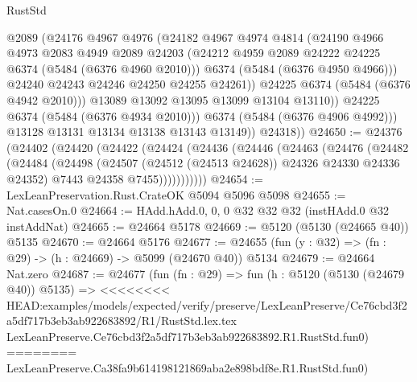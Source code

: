 \begin{lexlean}{RustStd}
\begin{coremodule}
{\begin{coremodule}
{{{{{{{{{{{{{{{{{{{{{{{{{{{{{{{                      @2089
                      (@24176
                        @4967
                        @4976
                        (@24182
                          @4967
                          @4974
                          @4814
                          (@24190
                            @4966
                            @4973
                            @2083
                            @4949
                            @2089
                            @24203
                            (@24212 @4959 @2089 @24222 @24225 @6374 (@5484 (@6376 @4960 @2010)))
                            @6374
                            (@5484 (@6376 @4950 @4966)))
                          @24240
                          @24243
                          @24246
                          @24250
                          @24255
                          @24261))
                      @24225
                      @6374
                      (@5484 (@6376 @4942 @2010)))
                    @13089
                    @13092
                    @13095
                    @13099
                    @13104
                    @13110))
                @24225
                @6374
                (@5484 (@6376 @4934 @2010)))
              @6374
              (@5484 (@6376 @4906 @4992)))
            @13128
            @13131
            @13134
            @13138
            @13143
            @13149))
        @24318))
@24650 := @24376
    (@24402
      (@24420
        (@24422
          (@24424
            (@24436
              (@24446
                (@24463
                  (@24476
                    (@24482
                      (@24484
                        (@24498
                          (@24507 (@24512 (@24513 @24628)) @24326 @24330 @24336 @24352)
                          @7443
                          @24358
                          @7455)))))))))))
@24654 := LexLeanPreservation.Rust.CrateOK @5094 @5096 @5098
@24655 := Nat.casesOn.{0}
@24664 := HAdd.hAdd.{0, 0, 0} @32 @32 @32 (instHAdd.{0} @32 instAddNat)
@24665 := @24664 @5178
@24669 := @5120 (@5130 (@24665 @40)) @5135
@24670 := @24664 @5176
@24677 := @24655 (fun (y : @32) => (fn : @29) -> (h : @24669) -> @5099 (@24670 @40)) @5134
@24679 := @24664 Nat.zero
@24687 := @24677
    (fun (fn : @29) =>
    fun (h : @5120 (@5130 (@24679 @40)) @5135) =>
<<<<<<<< HEAD:examples/models/expected/verify/preserve/LexLeanPreserve/Ce76cbd3f2a5df717b3eb3ab922683892/R1/RustStd.lex.tex
    LexLeanPreserve.Ce76cbd3f2a5df717b3eb3ab922683892.R1.RustStd.fun0)
========
    LexLeanPreserve.Ca38fa9b614198121869aba2e898bdf8e.R1.RustStd.fun0)
}}}}}}}}}}}}}}}}}}}}}}}}}}}}}}}
\end{coremodule}}
\end{coremodule}
\end{lexlean}
